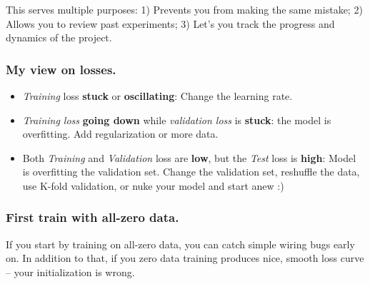 
This serves multiple purposes: 1) Prevents you from making the same mistake; 2) Allows you to review past experiments; 3) Let's you track the progress and dynamics of the project.


\subsubsection*{My view on losses.}
\begin{itemize}
\item {\em Training} loss {\bf stuck} or {\bf oscillating}: Change the learning rate.
\item {\em Training loss} {\bf going down} while {\em validation loss} is {\bf stuck}: the model is overfitting. Add regularization or more data.
\item Both {\em Training} and {\em Validation} loss are {\bf low}, but the {\em Test} loss is {\bf high}: Model is overfitting the validation set. Change the validation set, reshuffle the data, use K-fold validation, or nuke your model and start anew :)
\end{itemize}

\subsubsection*{First train with all-zero data.}
If you start by training on all-zero data, you can catch simple wiring bugs early on.
In addition to that, if you zero data training produces nice, smooth loss curve -- your initialization is wrong.

